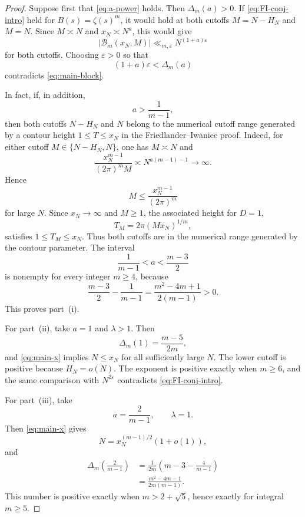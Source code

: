 \documentclass[11pt]{amsart}
\theoremstyle{plain}
\theoremstyle{definition}
\theoremstyle{remark}
\newcommand{\eps}{\varepsilon}
\newcommand{\Bcal}{\mathcal B}
\numberwithin{equation}{section}
\begin{document}
\begin{proof}
Suppose first that \eqref{eq:a-power} holds.  Then $\Delta_m(a)>0$.  If \eqref{eq:FI-conj-intro} held for $B(s)=\zeta(s)^m$, it would hold at both cutoffs $M=N-H_N$ and $M=N$.  Since $M\asymp N$ and $x_N\asymp N^a$, this would give
\[
  |\Bcal_m(x_N,M)|\ll_{m,\eps}N^{(1+a)\eps}
\]
for both cutoffs.  Choosing $\eps>0$ so that
\[
  (1+a)\eps<\Delta_m(a)
\]
contradicts \eqref{eq:main-block}.

In fact, if, in addition,
\begin{equation}\label{eq:a-contour}
  a>\frac1{m-1},
\end{equation}
then both cutoffs $N-H_N$ and $N$ belong to the numerical cutoff range generated by a contour height $1\le T\le x_N$ in the Friedlander--Iwaniec
proof. Indeed, for either cutoff $M\in\{N-H_N,N\}$, one has $M\asymp N$ and
\[
  \frac{x_N^{m-1}}{(2\pi)^mM}
  \asymp N^{a(m-1)-1}\longrightarrow\infty.
\]
Hence
\begin{equation}\label{eq:contour-upper}
  M\le\frac{x_N^{m-1}}{(2\pi)^m}
\end{equation}
for large $N$.  Since $x_N\to\infty$ and $M\ge1$, the associated height for $D=1$,
\[
  T_M=2\pi(Mx_N)^{1/m},
\]
satisfies $1\le T_M\le x_N$.  Thus both cutoffs are in the numerical range generated by the contour parameter.  The interval
\[
  \frac1{m-1}<a<\frac{m-3}{2}
\]
is nonempty for every integer $m\ge4$, because
\[
  \frac{m-3}{2}-\frac1{m-1}
  =\frac{m^2-4m+1}{2(m-1)}>0.
\]
This proves part~\textup{(i)}.

For part~\textup{(ii)}, take $a=1$ and $\lambda>1$.  Then
\[
  \Delta_m(1)=\frac{m-5}{2m},
\]
and \eqref{eq:main-x} implies $N\le x_N$ for all sufficiently large $N$.  The lower cutoff is positive because $H_N=o(N)$.  The exponent is positive exactly when $m\ge6$, and the same comparison with $N^{2\eps}$ contradicts \eqref{eq:FI-conj-intro}.

For part~\textup{(iii)}, take
\[
  a=\frac2{m-1},
  \qquad
  \lambda=1.
\]
Then \eqref{eq:main-x} gives
\[
  N=x_N^{(m-1)/2}(1+o(1)),
\]
and
\begin{align*}
  \Delta_m\!\left(\frac2{m-1}\right)
  &=\frac1{2m}\left(m-3-\frac4{m-1}\right)\\
  &=\frac{m^2-4m-1}{2m(m-1)}.
\end{align*}
This number is positive exactly when $m>2+\sqrt5$, hence exactly for integral $m\ge5$.
\end{proof}
\end{document}
